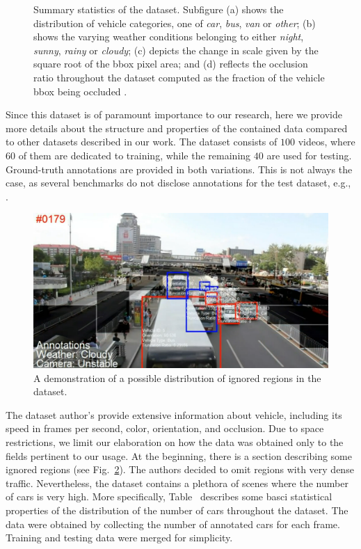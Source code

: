 \begin{figure}[t]
\begin{subfigure}[b]{\uadetracfigsize\textwidth}
        \caption[]{}
    \end{subfigure}
    \caption[ dataset overview]{Summary statistics of the  dataset. Subfigure (a) shows the distribution of vehicle categories, one of \emph{car}, \emph{bus}, \emph{van} or \emph{other}; (b) shows the varying weather conditions belonging to either \emph{night}, \emph{sunny}, \emph{rainy} or \emph{cloudy}; (c) depicts the change in scale given by the square root of the \gls{bbox} pixel area; and (d) reflects the occlusion ratio throughout the dataset computed as the fraction of the vehicle \gls{bbox} being occluded . }
    \label{fig:UADETRACStats}
\end{figure}

Since this dataset is of paramount importance to our research, here we provide more details about the structure and properties of the contained data compared to other datasets described in our work. The dataset consists of $100$ videos, where $60$ of them are dedicated to training, while the remaining $40$ are used for testing. Ground-truth annotations are provided in both variations. This is not always the case, as several benchmarks do not disclose annotations for the test dataset, e.g.,  \cite{Geiger2012CVPR}.

\begin{figure}[t]
    \centerline{\includegraphics[width=0.8\linewidth]{figures/datasets/uadetrac_ignored_regions.png}}
    \caption[Ignored regions in ]{A demonstration of a possible distribution of ignored regions in the  dataset. }
    \label{fig:UADETRACIgnoredRegions}
\end{figure}

The dataset author's provide extensive information about vehicle, including its speed in frames per second, color, orientation, and occlusion. Due to space restrictions, we limit our elaboration on how the data was obtained only to the fields pertinent to our usage. At the beginning, there is a section describing some ignored regions (see Fig.~\ref{fig:UADETRACIgnoredRegions}). The authors decided to omit regions with very dense traffic. Nevertheless, the dataset contains a plethora of scenes where the number of cars is very high. More specifically, Table~ describes some basci statistical properties of the distribution of the number of cars throughout the dataset. The data were obtained by collecting the number of annotated cars for each frame. Training and testing data were merged for simplicity.
